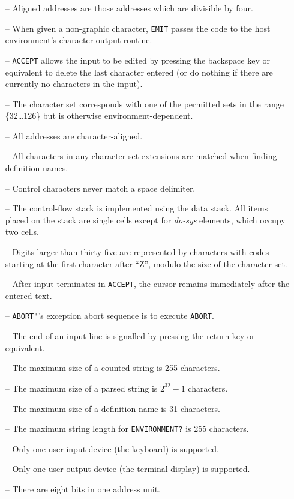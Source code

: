 \documentclass[english]{article}
\newcommand{\spic}[1]{{\it #1\/}}
\begin{document}
\begin{itemize}
\item[--]Aligned addresses are those addresses which are divisible by four.
\item[--]When given a non-graphic character, {\tt EMIT} passes the code to the host environment's character output routine.
\item[--]{\tt ACCEPT} allows the input to be edited by pressing the backspace key or equivalent to delete the last character entered (or do nothing if there are currently no characters in the input).
\item[--]The character set corresponds with one of the permitted sets in the range \{32\dots 126\} but is otherwise environment-dependent.
\item[--]All addresses are character-aligned.
\item[--]All characters in any character set extensions are matched when finding definition names.
\item[--]Control characters never match a space delimiter.
\item[--]The control-flow stack is implemented using the data stack. All items placed on the stack are single cells except for \spic{do-sys} elements, which occupy two cells.
\item[--]Digits larger than thirty-five are represented by characters with codes starting at the first character after ``Z'', modulo the size of the character set.
\item[--]After input terminates in {\tt ACCEPT}, the cursor remains immediately after the entered text.
\item[--]{\tt ABORT"}'s exception abort sequence is to execute {\tt ABORT}.
\item[--]The end of an input line is signalled by pressing the return key or equivalent.
\item[--]The maximum size of a counted string is 255 characters.
\item[--]The maximum size of a parsed string is $2^{32}-1$ characters.
\item[--]The maximum size of a definition name is 31 characters.
\item[--]The maximum string length for {\tt ENVIRONMENT?} is 255 characters.
\item[--]Only one user input device (the keyboard) is supported.
\item[--]Only one user output device (the terminal display) is supported.
\item[--]There are eight bits in one address unit.

\end{itemize}
\end{document}
